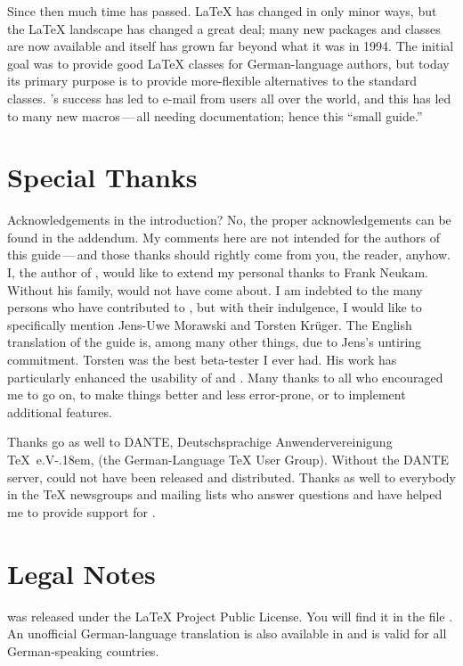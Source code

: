 Since then much time has passed. {\LaTeX} has changed in only minor
ways, but the {\LaTeX} landscape has changed a great deal; many new
packages and classes are now available and {\KOMAScript} itself has
grown far beyond what it was in 1994. The initial goal was to provide
good {\LaTeX} classes for German-language authors, but today its
primary purpose is to provide more-flexible alternatives to the
standard classes. {\KOMAScript}'s success has led to e-mail from users
all over the world, and this has led to many new macros\,---\,all
needing documentation; hence this ``small guide.''


\section{Special Thanks}

Acknowledgements in the introduction? No, the proper acknowledgements can be
found in the addendum. My comments here are not intended for the authors of
this guide\,---\,and those thanks should rightly come from you, the reader,
anyhow. I, the author of {\KOMAScript}, would like to extend my personal thanks
to Frank Neukam.  Without his {\Script} family, {\KOMAScript} would not have
come about.  I am indebted to the many persons who have contributed to
{\KOMAScript}, but with their indulgence, I would like to specifically mention
Jens-Uwe Morawski and Torsten Kr\"uger. The English translation of the guide
is, among many other things, due to Jens's untiring commitment. Torsten was
the best beta-tester I ever had. His work has particularly enhanced the
usability of  and . Many thanks to all who
encouraged me to go on, to make things better and less error-prone, or to
implement additional features.

Thanks go as well to DANTE, Deutschsprachige
Anwendervereinigung {\TeX}~e.V\kern-.18em, (the German-Language {\TeX} User Group).
Without the DANTE server, {\KOMAScript} could not have been released and
distributed. Thanks as well to everybody in the {\TeX} newsgroups and mailing
lists who answer questions and have helped me to provide support for
{\KOMAScript}.


\section{Legal Notes}

{\KOMAScript} was released under the {\LaTeX} Project Public License. You
will find it in the file . An unofficial German-language
translation is also available in  and is valid for all
German-speaking countries.

